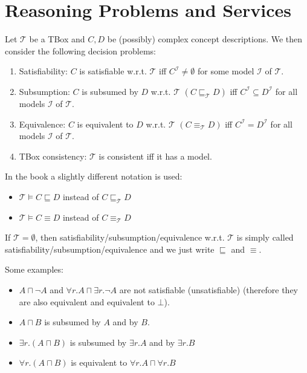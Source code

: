 \section{Reasoning Problems and Services}
\begin{definition}
	Let $\mathcal{T}$ be a TBox and $C,D$ be (possibly) complex concept descriptions.
	We then consider the following decision problems:
	\begin{enumerate}
		\item Satisfiability: $C$ is satisfiable w.r.t. $\mathcal{T}$ iff
			$C^{\mathcal{I}} \neq \emptyset$ for some model $\mathcal{I}$ of $\mathcal{T}$.
		\item Subsumption: $C$ is subsumed by $D$ w.r.t. $\mathcal{T}$ $\left( C \sqsubseteq_{\mathcal{T}} D \right)$ iff
			$C^{\mathcal{I}} \subseteq D^{\mathcal{I}}$ for all models $\mathcal{I}$ of $\mathcal{T}$.
		\item Equivalence: $C$ is equivalent to $D$ w.r.t. $\mathcal{T}$ $\left( C \equiv_{\mathcal{T}} D \right) $ iff
			$C^{\mathcal{I}} = D^{\mathcal{I}}$ for all models $\mathcal{I}$ of $\mathcal{T}$.
		\item TBox consistency: $\mathcal{T}$ is consistent iff it has a model.
	\end{enumerate}
\end{definition}
\begin{notation}
	In the book a slightly different notation is used:
	\begin{itemize}
		\item $\mathcal{T} \vDash C \sqsubseteq D$ instead of $C \sqsubseteq_{\mathcal{T}} D$
		\item $\mathcal{T} \vDash C \equiv D$ instead of $C \equiv_{\mathcal{T}}D$
	\end{itemize}
\end{notation}
\begin{note}
	If $\mathcal{T} = \emptyset$, then satisfiability/subsumption/equivalence w.r.t. $\mathcal{T}$ is simply called satisfiability/subsumption/equivalence
	and we just write $\sqsubseteq$ and $\equiv$.	
\end{note}

\begin{example}
	Some examples:
	\begin{itemize}
		\item $A \sqcap \neg A$ and $\forall r.A \sqcap \exists r.\neg A$ are not satisfiable (unsatisfiable) \newline
			(therefore they are also equivalent and equivalent to $\bot$).
		\item $A \sqcap B$ is subsumed by $A$ and by $B$.
		\item $\exists r.(A \sqcap B)$ is subsumed by $\exists r.A$ and by $\exists r.B$
		\item $\forall r.(A \sqcap B)$ is equivalent to $\forall r.A  \sqcap \forall r.B$
	\end{itemize}
\end{example}

